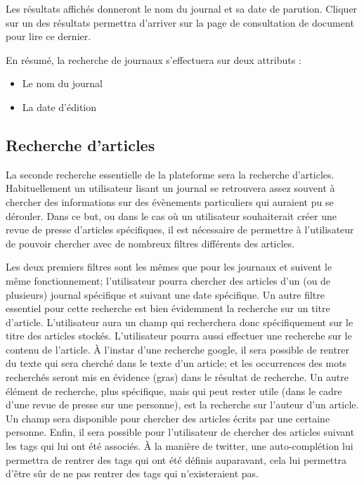 Les résultats affichés donneront le nom du journal et sa date de parution. Cliquer sur un des résultats permettra d'arriver sur la page de consultation de document pour lire ce dernier.

En résumé, la recherche de journaux s'effectuera sur deux attributs :
\begin{itemize}
	\item Le nom du journal
	\item La date d'édition
\end{itemize}

\subsection{Recherche d'articles}
\label{sec:recherche_article}

La seconde recherche essentielle de la plateforme sera la recherche d'articles. Habituellement un utilisateur lisant un journal se retrouvera assez souvent à chercher des informations sur des évènements particuliers qui auraient pu se dérouler. Dans ce but, ou dans le cas où un utilisateur souhaiterait créer une revue de presse d'articles spécifiques, il est nécessaire de permettre à l'utilisateur de pouvoir chercher avec de nombreux filtres différents des articles.

Les deux premiers filtres sont les mêmes que pour les journaux et suivent le même fonctionnement; l'utilisateur pourra chercher des articles d'un (ou de plusieurs) journal spécifique et suivant une date spécifique. Un autre filtre essentiel pour cette recherche est bien évidemment la recherche sur un titre d'article. L'utilisateur aura un champ qui recherchera donc spécifiquement sur le titre des articles stockés. L'utilisateur pourra aussi effectuer une recherche sur le contenu de l'article. À l'instar d'une recherche google, il sera possible de rentrer du texte qui sera cherché dans le texte d'un article; et les occurrences des mots recherchés seront mis en évidence (gras) dans le résultat de recherche. Un autre élément de recherche, plus spécifique, mais qui peut rester utile (dans le cadre d'une revue de presse sur une personne), est la recherche sur l'auteur d'un article. Un champ sera disponible pour chercher des articles écrits par une certaine personne. Enfin, il sera possible pour l'utilisateur de chercher des articles suivant les tags qui lui ont été associés. À la manière de twitter, une auto-complétion lui permettra de rentrer des tags qui ont été définis auparavant, cela lui permettra d'être sûr de ne pas rentrer des tags qui n'existeraient pas.

